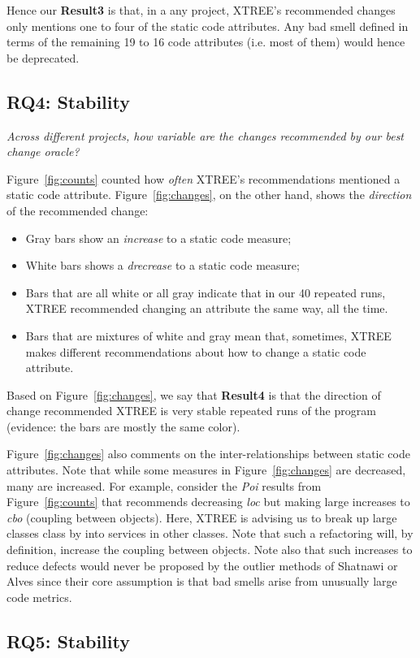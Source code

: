 \documentclass[twocolumn,5p]{elsarticle}
\newcommand{\bi}{\begin{itemize}[leftmargin=0.4cm]}
\newcommand{\ei}{\end{itemize}}
\newcommand{\fig}[1]{Figure~\ref{fig:#1}}
\theoremstyle{break}
\begin{document}
\begin{itemize}
Hence our {\bf Result3} is that, in a any  project,  XTREE's  recommended  changes  only  mentions one to four 
of the  static code attributes.  Any bad smell defined in terms of the remaining 19 to 16 code attributes (i.e. most of them)
would hence be deprecated.


\subsection{RQ4: Stability}

{\em Across different projects, how variable are the changes recommended by our best change oracle? }


\fig{counts} counted how {\em often} XTREE's recommendations mentioned a static code attribute.
\fig{changes}, on the other hand, shows the {\em direction} of the recommended change:
\bi
\item Gray bars show  an  {\em increase} to a static code measure;
\item White bars shows a   {\em drecrease} to a static code measure;
\item Bars that are all white or all gray indicate that in our 40 repeated runs, XTREE recommended changing an attribute the same way, all the time.
\item Bars that are mixtures of white and gray mean that, sometimes, XTREE makes different recommendations about how to change a static
code attribute.
\ei
Based on \fig{changes}, we say that {\bf Result4} is that the direction of change recommended  XTREE is  very stable repeated runs of the program  (evidence:
the bars are mostly the same color).

\fig{changes} also comments on the inter-relationships between static code attributes. Note that while some measures in
\fig{changes} are decreased, many are increased.  
For example, consider the {\em Poi} results
from \fig{counts} that recommends decreasing {\em loc}
but making large increases to {\em cbo} (coupling between
objects). Here, XTREE is advising us to break up
large classes class by into services
in other classes. Note that such a refactoring will, by
definition, increase the coupling between objects. 
Note also that such increases  to reduce
defects would never be proposed by the outlier methods
of Shatnawi or Alves since their core assumption is that bad
smells arise from unusually large code metrics.
 
\subsection{RQ5: Stability}


\end{itemize}
\end{document}
